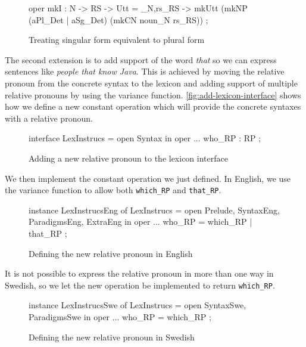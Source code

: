 \begin{figure}[H]
\begin{code}
oper
  mkI : N -> RS -> Utt = \noun_N,rs_RS -> mkUtt (mkNP (aPl_Det | aSg_Det)
                             (mkCN noun_N rs_RS)) ;
\end{code}
\caption{Treating singular form equivalent to plural form\label{fig:mkI-modification}}
\end{figure}
The second extension is to add support of the word \emph{that} so we can express sentences like \emph{people that know Java}. This is achieved by moving the relative pronoun from the concrete syntax to the lexicon and adding support of multiple relative pronouns by using the variance function. \autoref{fig:add-lexicon-interface} shows how we define a new constant operation which will provide the concrete syntaxes with a relative pronoun.

\begin{figure}[H]
\begin{code}
interface LexInstrucs = open Syntax in {
  oper
    ...
    who_RP : RP ;
}
\end{code}
\caption{Adding a new relative pronoun to the lexicon interface\label{fig:add-lexicon-interface}}
\end{figure}

We then implement the constant operation we just defined. In English, we use the variance function to allow both \texttt{which\_RP} and \texttt{that\_RP}.

\begin{figure}[H]
\begin{code}
instance LexInstrucsEng of LexInstrucs = open Prelude, SyntaxEng, 
                                      ParadigmsEng, ExtraEng in {
  oper
    ...
    who_RP = which_RP | that_RP ;
}
\end{code}
\caption{Defining the new relative pronoun in English\label{fig:add-lexicon-english}}
\end{figure}

It is not possible to express the relative pronoun in more than one way in Swedish, so we let the new operation be implemented to return \texttt{which\_RP}.

\begin{figure}[H]
\begin{code}
instance LexInstrucsSwe of LexInstrucs = open SyntaxSwe, ParadigmsSwe in {
  oper
    ...
    who_RP = which_RP ;
}
\end{code}
\caption{Defining the new relative pronoun in Swedish\label{fig:add-lexicon-swedish}}
\end{figure}


